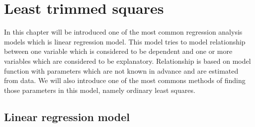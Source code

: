 
\chapter{Least trimmed squares}
In this chapter will be introduced one of the most common regression analysis models which is linear regression model. This model tries to model relationship between one variable which is considered to be dependent and one or more variables which are considered to be explanatory. Relationship is based on model function with parameters which are not known in advance and are estimated from data. We will also introduce one of the most commons methods of finding those parameters in this model, namely ordinary least squares.
\section{Linear regression model}

